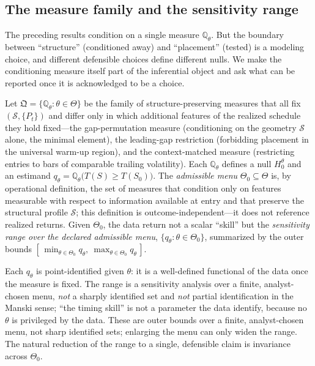 \subsection{The measure family and the sensitivity range}
\label{sec:measure-family}

The preceding results condition on a single measure $\mathbb{Q}_\theta$. But the
boundary between ``structure'' (conditioned away) and ``placement'' (tested) is a
modeling choice, and different defensible choices define different nulls. We make
the conditioning measure itself part of the inferential object and ask what can be
reported once it is acknowledged to be a choice.

\begin{definition}
\label{def:measure-family}
Let $\mathfrak Q=\{\mathbb{Q}_\theta:\theta\in\Theta\}$ be the family of
structure-preserving measures that all fix $(\mathcal S,\{P_t\})$ and differ only
in which additional features of the realized schedule they hold fixed---the
gap-permutation measure (conditioning on the geometry $\mathcal S$ alone, the
minimal element), the leading-gap restriction (forbidding placement in the
universal warm-up region), and the context-matched measure (restricting entries
to bars of comparable trailing volatility). Each $\mathbb{Q}_\theta$ defines a null
$H_0^\theta$ and an estimand $q_\theta=\mathbb{Q}_\theta\big(T(S)\ge
T(S_0)\big)$. The \emph{admissible menu} $\Theta_0\subseteq\Theta$ is, by
operational definition, the set of measures that condition only on features
measurable with respect to information available at entry and that preserve the
structural profile $\mathcal S$; this definition is outcome-independent---it does
not reference realized returns. Given $\Theta_0$, the data return not a scalar
``skill'' but the \emph{sensitivity range over the declared admissible menu},
$\{q_\theta:\theta\in\Theta_0\}$, summarized by the outer bounds
$[\,\min_{\theta\in\Theta_0}q_\theta,\ \max_{\theta\in\Theta_0}q_\theta\,]$.
\end{definition}

Each $q_\theta$ is point-identified given $\theta$: it is a well-defined
functional of the data once the measure is fixed. The range is a sensitivity
analysis over a finite, analyst-chosen menu, \emph{not} a sharply identified set
and \emph{not} partial identification in the Manski sense; ``the timing skill''
is not a parameter the data identify, because no $\theta$ is privileged by the
data. These are outer bounds over a finite, analyst-chosen menu, not sharp
identified sets; enlarging the menu can only widen the range. The natural
reduction of the range to a single, defensible claim is invariance across
$\Theta_0$.

